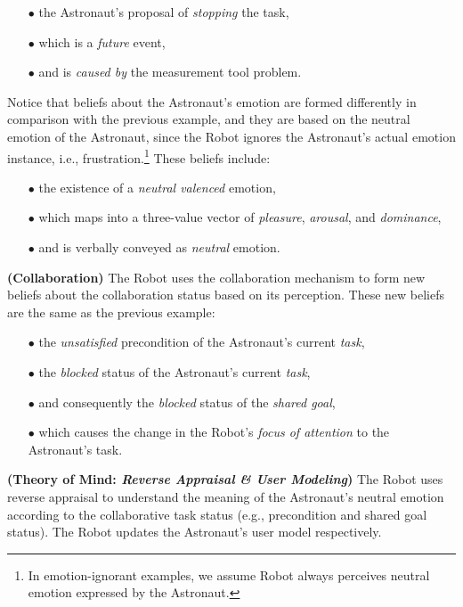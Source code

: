 \begin{itemize}
  \item[$\bullet$] the Astronaut's proposal of \textit{stopping} the task,
  \item[$\bullet$] which is a \textit{future} event,
  \item[$\bullet$] and is \textit{caused by} the measurement tool problem.
\end{itemize}

\noindent Notice that beliefs about the Astronaut's emotion are formed
differently in comparison with the previous example, and they are based on the
neutral emotion of the Astronaut, since the Robot ignores the Astronaut's actual
emotion instance, i.e., frustration.\footnote{In emotion-ignorant examples, we
assume Robot always perceives neutral emotion expressed by the Astronaut.} These
beliefs include:

\begin{itemize}
  \item[$\bullet$] the existence of a \textit{neutral valenced} emotion,
  \item[$\bullet$] which maps into a three-value vector of \textit{pleasure},
  \textit{arousal}, and \textit{dominance},
  \item[$\bullet$] and is verbally conveyed as \textit{neutral} emotion.\\
\end{itemize}

\noindent\textbf{(Collaboration)} The Robot uses the collaboration mechanism to
form new beliefs about the collaboration status based on its perception. These
new beliefs are the same as the previous example:

\begin{itemize}
  \item[$\bullet$] the \textit{unsatisfied} precondition of the Astronaut's
  current \textit{task},
  \item[$\bullet$] the \textit{blocked} status of the Astronaut's current
  \textit{task},
  \item[$\bullet$] and consequently the \textit{blocked} status of the
  \textit{shared goal},
  \item[$\bullet$] which causes the change in the Robot's \textit{focus of
  attention} to the Astronaut's task.
\end{itemize}

\noindent\textbf{(Theory of Mind: \textit{Reverse Appraisal \& User Modeling})}
The Robot uses reverse appraisal to understand the meaning of the Astronaut's
neutral emotion according to the collaborative task status (e.g., precondition
and shared goal status). The Robot updates the Astronaut's user model
respectively.\\

